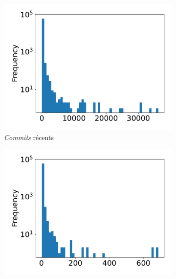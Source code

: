 \documentclass[dvipsnames,runningheads]{llncs}
\newcommand{\en}[1]{\foreignlanguage{english}{\emph{#1}}}
\begin{document}
    \captionsetup[figure]{format=plain,singlelinecheck=true,justification=centering}
    \captionsetup[subfigure]{format=plain,singlelinecheck=true,justification=centering}
    \captionsetup[table]{format=plain,singlelinecheck=true,justification=centering,position=above}

    \begin{figure}
        \begin{subfigure}[t]{0.333\textwidth}
            \includegraphics[width=\textwidth]{../experiment/data_analysis/recentCommitCount_distribution}
            \caption{\en{Commits} récents}
        \end{subfigure}
        \begin{subfigure}[t]{0.333\textwidth}
            \includegraphics[width=\textwidth]{../experiment/data_analysis/recentContributorCount_distribution}

\end{subfigure}
\end{figure}
\end{document}
